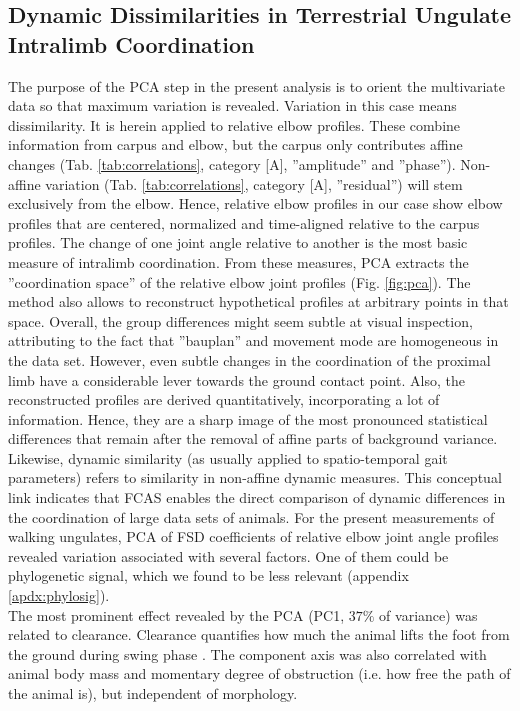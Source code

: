 \subsection{Dynamic Dissimilarities in Terrestrial Ungulate Intralimb Coordination}
The purpose of the PCA step in the present analysis is to orient the multivariate data so that maximum variation is revealed.
Variation in this case means dissimilarity.
It is herein applied to relative elbow profiles.
These combine information from carpus and elbow, but the carpus only contributes affine changes (Tab. \ref{tab:correlations}, category [A], ''amplitude'' and ''phase'').
Non-affine variation (Tab. \ref{tab:correlations}, category [A], ''residual'') will stem exclusively from the elbow.
Hence, relative elbow profiles in our case show elbow profiles that are centered, normalized and time-aligned relative to the carpus profiles.
The change of one joint angle relative to another is the most basic measure of intralimb coordination.
From these measures, PCA extracts the ''coordination space'' of the relative elbow joint profiles (Fig. \ref{fig:pca}).
The method also allows to reconstruct hypothetical profiles at arbitrary points in that space.
Overall, the group differences might seem subtle at visual inspection, attributing to the fact that ''bauplan'' and movement mode are homogeneous in the data set.
However, even subtle changes in the coordination of the proximal limb have a considerable lever towards the ground contact point.
Also, the reconstructed profiles are derived quantitatively, incorporating a lot of information.
Hence, they are a sharp image of the most pronounced statistical differences that remain after the removal of affine parts of background variance.
Likewise, dynamic similarity (as usually applied to spatio-temporal gait parameters) refers to similarity in non-affine dynamic measures.
This conceptual link indicates that FCAS enables the direct comparison of dynamic differences in the coordination of large data sets of animals.
For the present measurements of walking ungulates, PCA of FSD coefficients of relative elbow joint angle profiles revealed variation associated with several factors.
One of them could be phylogenetic signal, which we found to be less relevant (appendix \ref*{apdx:phylosig}).
\smallskip\\The most prominent effect revealed by the PCA (PC1, $37\%$ of variance) was related to clearance.
Clearance quantifies how much the animal lifts the foot from the ground during swing phase \citep{Austin1999,MacLellan2010,Perrot2011}.
The component axis was also correlated with animal body mass and momentary degree of obstruction (i.e. how free the path of the animal is), but independent of morphology.
